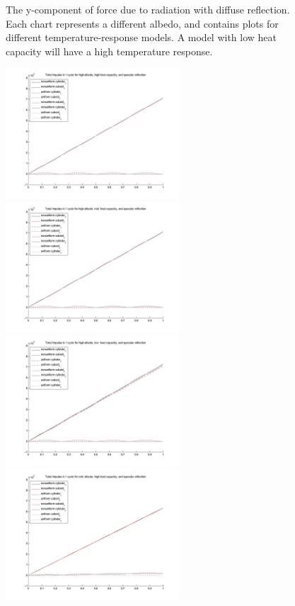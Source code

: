 \begin{description}
\begin{figure}
       \caption{The y-component of force due to radiation with diffuse
       reflection.  Each chart represents a different albedo, and contains
       plots for different temperature-response models.  A model with low
       heat capacity will have a high temperature response.}
       \label{fig:ivv_platemod_fig4}
     \end{figure}

     \begin{figure}[!ht]
     \leftskip=-20mm
     \begin{minipage}[t]{200mm}\centering
     \includegraphics[width=65mm]{figs/Plate_mod/I_alb_high_HC_high_ref_spc.jpg}
     \includegraphics[width=65mm]{figs/Plate_mod/I_alb_high_HC_mid__ref_spc.jpg}
     \includegraphics[width=65mm]{figs/Plate_mod/I_alb_high_HC_low__ref_spc.jpg}
     \includegraphics[width=65mm]{figs/Plate_mod/I_alb_mid__HC_high_ref_spc.jpg}

\end{minipage}
\end{figure}
\end{description}
